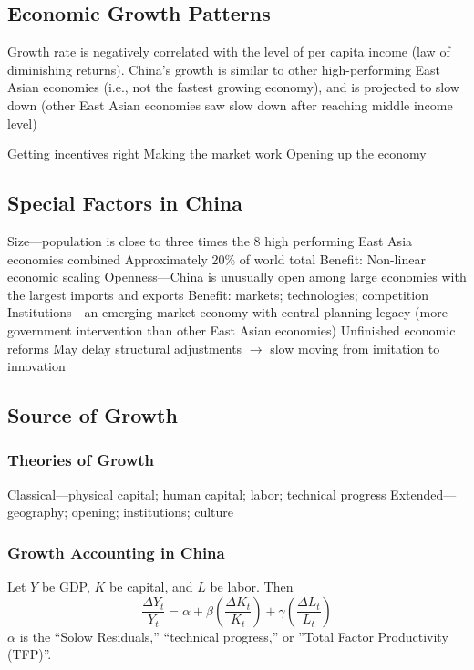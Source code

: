 \documentclass[11pt]{article}
\theoremstyle{definition}
\theoremstyle{remark}
\begin{document}
\subsection{Economic Growth Patterns}
Growth rate is negatively correlated with the level of per capita income (law of diminishing returns). China's growth is similar to other high-performing East Asian economies (i.e., not the fastest growing economy), and is projected to slow down (other East Asian economies saw slow down after reaching middle income level)
\begin{outline}[enumerate]
\1 Getting incentives right
\1 Making the market work
\1 Opening up the economy
\end{outline}


\subsection{Special Factors in China}
\begin{outline}[enumerate]
\1 Size---population is close to three times the 8 high performing East Asia economies combined
	\2 Approximately 20\% of world total
	\2 Benefit: Non-linear economic scaling
\1 Openness---China is unusually open among large economies with the largest imports and exports
	\2 Benefit: markets; technologies; competition
\1 Institutions---an emerging market economy with central planning legacy (more government intervention than other East Asian economies)
	\2 Unfinished economic reforms
	\2 May delay structural adjustments $\to$ slow moving from imitation to innovation
\end{outline}

\subsection{Source of Growth}
\subsubsection{Theories of Growth}
\begin{outline}[enumerate]
\1 Classical---physical capital; human capital; labor; technical progress
\1 Extended---geography; opening; institutions; culture
\end{outline}
\subsubsection{Growth Accounting in China}
Let $Y$ be GDP, $K$ be capital, and $L$ be labor. Then
\begin{equation}
\frac{\Delta Y_t}{Y_t} = \alpha + \beta\left(\frac{\Delta K_t}{K_t}\right) + \gamma\left(\frac{\Delta L_t}{L_t}\right)
\end{equation}
$\alpha$ is the ``Solow Residuals,'' ``technical progress,'' or ''Total Factor Productivity (TFP)''.
\end{document}
